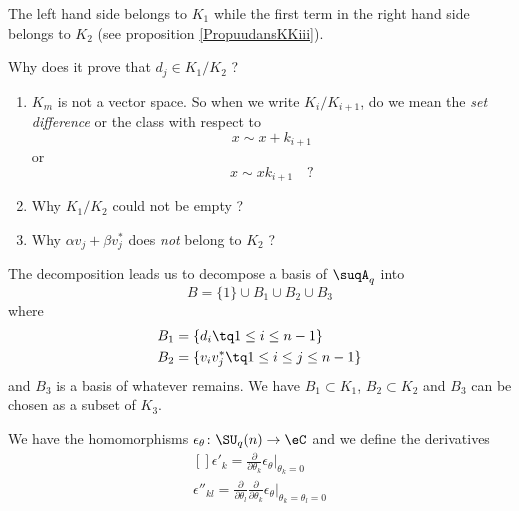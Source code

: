     The left hand side belongs to $K_1$ while the first term in the right hand side belongs to $K_2$ (see proposition \ref{PropuudansKKiii}).

    \begin{probleme}
        Why does it prove that $d_j\in K_1/K_2$ ?
        \begin{enumerate}
            \item
                $K_m$ is not a vector space. So when we write $K_i/K_{i+1}$, do we mean the \emph{set difference} or the class with respect to
                \begin{equation}
                    x\sim x+k_{i+1}
                \end{equation}
                or
                \begin{equation}
                    x\sim xk_{i+1}\quad ?
                \end{equation}
            \item
                Why $K_1/K_2$ could not be empty ?
            \item
                Why $\alpha v_j+\beta v_j^*$ does \emph{not} belong to $K_2$ ?
        \end{enumerate}
        
    \end{probleme}

The decomposition leads us to decompose a basis of $\suqA_q$ into
\begin{equation}
    B=\{ 1 \}\cup B_1\cup B_2\cup B_3
\end{equation}
where 
\begin{equation}
    \begin{aligned}[]
        B_1&=\{ d_i\tq 1\leq i\leq n-1 \}\\
        B_2&=\{ v_iv_j^*\tq 1\leq i\leq j\leq n-1 \}
    \end{aligned}
\end{equation}
and $B_3$ is a basis of whatever remains. We have $B_1\subset K_1$, $B_2\subset K_2$ and $B_3$ can be chosen as a subset of $K_3$.


We have the homomorphisms $\epsilon_{\theta}\colon \SU_q(n)\to \eC$ and we define the derivatives
\begin{equation}
    \begin{aligned}[]
        \epsilon'_k=\frac{ \partial  }{ \partial \theta_k }\epsilon_{\theta}|_{\theta_k=0}\\
        \epsilon''_{kl}=\frac{ \partial  }{ \partial \theta_l }\frac{ \partial  }{ \partial \theta_k }\epsilon_{\theta}|_{\theta_k=\theta_l=0}
    \end{aligned}
\end{equation}

